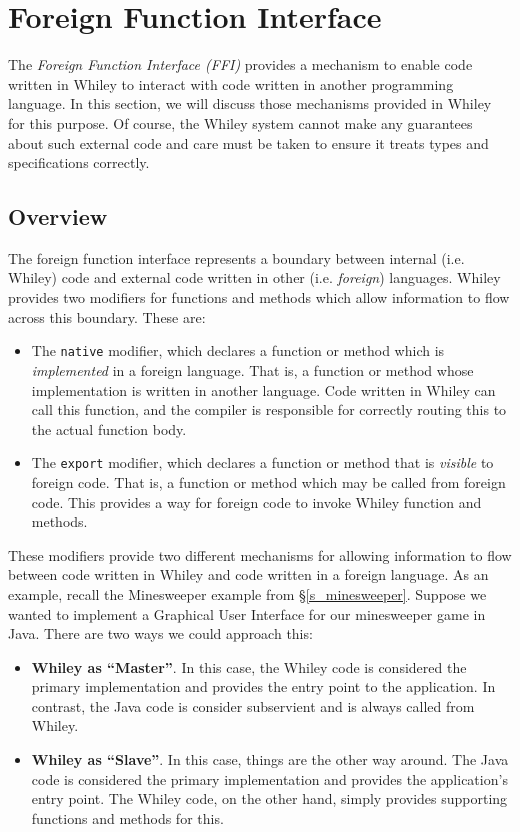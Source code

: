 \section{Foreign Function Interface}
\label{s_ffi}
The {\em Foreign Function Interface (FFI)} provides a mechanism to enable code written in Whiley to interact with code written in another programming language.  In this section, we will discuss those mechanisms provided in Whiley for this purpose.  Of course, the Whiley system cannot make any guarantees about such external code and care must be taken to ensure it treats types and specifications correctly.  

\subsection{Overview}

The foreign function interface represents a boundary between internal (i.e. Whiley) code and external code written in other (i.e. {\em foreign}) languages.  Whiley provides two modifiers for functions and methods which allow information to flow across this boundary.  These are:

\begin{itemize}
\item The \lstinline{native} modifier, which declares a function or method which is {\em implemented} in a foreign language.  That is, a function or method whose implementation is written in another language.  Code written in Whiley can call this function, and the compiler is responsible for correctly routing this to the actual function body.

\item The \lstinline{export} modifier, which declares a function or method that is {\em visible} to foreign code.  That is, a function or method which may be called from foreign code.  This provides a way for foreign code to invoke Whiley function and methods.
\end{itemize}

These modifiers provide two different mechanisms for allowing information to flow between code written in Whiley and code written in a foreign language.  As an example, recall the Minesweeper example from \S\ref{s_minesweeper}.  Suppose we wanted to implement a Graphical User Interface for our minesweeper game in Java.  There are two ways we could approach this:

\begin{itemize}
\item {\bf Whiley as ``Master''}.  In this case, the Whiley code is considered the primary implementation and provides the entry point to the application.  In contrast, the Java code is consider subservient and is always called from Whiley.
\item {\bf Whiley as ``Slave''}.  In this case, things are the other way around.  The Java code is considered the primary implementation and provides the application's entry point.  The Whiley code, on the other hand, simply provides supporting functions and methods for this.
\end{itemize}


